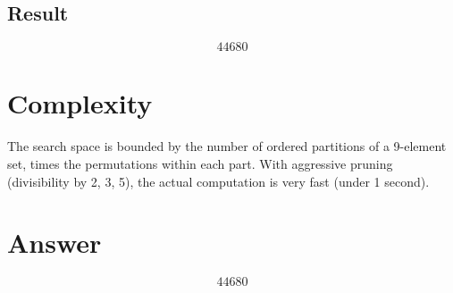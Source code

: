 \documentclass[12pt]{article}
\begin{document}
\subsection{Result}
\[
\boxed{44680}
\]

\section{Complexity}
The search space is bounded by the number of ordered partitions of a 9-element set, times the permutations within each part. With aggressive pruning (divisibility by 2, 3, 5), the actual computation is very fast (under 1 second).

\section{Answer}

\[
\boxed{44680}
\]
\end{document}
